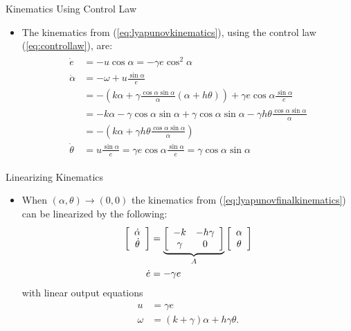 \documentclass[hyperref={pdfpagelabels=false}]{beamer}
\begin{document}
\begin{frame}{Kinematics Using Control Law}
\begin{itemize}
\item The kinematics from (\ref{eq:lyapunovkinematics}), using the control law (\ref{eq:controllaw}), are:
\begin{align}
\label{eq:lyapunovfinalkinematics}
\begin{split}
\dot{e} &= -u\cos\alpha = -\gamma e\cos^2\alpha \\
\dot{\alpha} &= -\omega + u\frac{\sin\alpha}{e} \\
&= -(k\alpha+\gamma\frac{\cos\alpha\sin\alpha}{\alpha}(\alpha+h\theta))+\gamma e\cos\alpha\frac{\sin\alpha}{e} \\
&= -k\alpha-\gamma\cos\alpha\sin\alpha+\gamma\cos\alpha\sin\alpha-\gamma h\theta\frac{\cos\alpha\sin\alpha}{\alpha} \\
&= -\left(k\alpha + \gamma h\theta\frac{\cos\alpha\sin\alpha}{\alpha}\right) \\
\dot{\theta} &= u\frac{\sin\alpha}{e} = \gamma e\cos\alpha\frac{\sin\alpha}{e} = \gamma\cos\alpha\sin\alpha
\end{split}
\end{align}
\end{itemize}
\end{frame}

\begin{frame}{Linearizing Kinematics}
\begin{itemize}
\item When $(\alpha,\theta)\to(0,0)$ the kinematics from (\ref{eq:lyapunovfinalkinematics}) can be linearized by the following:
\begin{align}
\label{eq:lyapunovLinearSystem}
\begin{split}
\left[\begin{array}{c} \dot{\alpha} \\ \dot{\theta} \end{array}\right]
&= \underbrace{\left[\begin{array}{c c} -k & -h\gamma \\ \gamma & 0 \end{array}\right]}_{A}
\left[\begin{array}{c} \alpha \\ \theta \end{array}\right] \\
\dot{e} &= -\gamma e
\end{split}
\end{align}
with linear output equations
\begin{align*}
\begin{split}
u &= \gamma e \\
\omega &= (k+\gamma)\alpha + h\gamma\theta.
\end{split}
\end{align*}
\end{itemize}
\end{frame}
\end{document}
